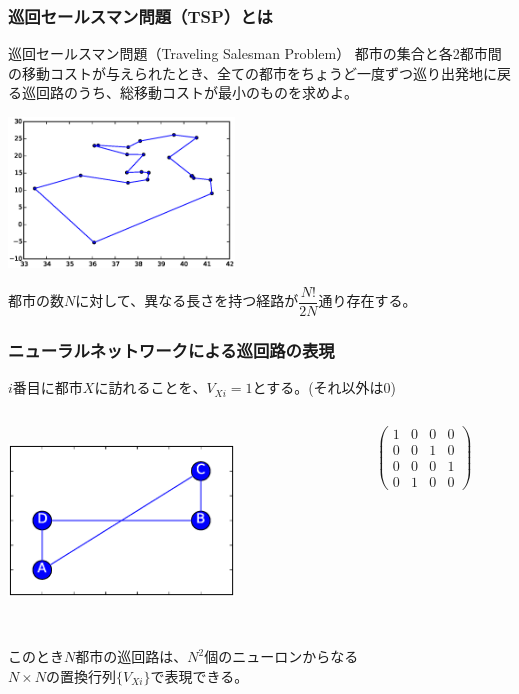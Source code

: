 \documentclass[dvipdfmx,11pt,notheorems]{beamer}
\theoremstyle{definition}
\begin{document}
\begin{frame}\frametitle{巡回セールスマン問題（TSP）とは}
\begin{block}{巡回セールスマン問題（Traveling Salesman Problem）}
都市の集合と各2都市間の移動コストが与えられたとき、全ての都市をちょうど一度ずつ巡り出発地に戻る巡回路のうち、総移動コストが最小のものを求めよ。
\end{block}
\begin{center}
\includegraphics[height=4cm, width=6cm]{opt_route.eps}
\end{center}
都市の数$N$に対して、異なる長さを持つ経路が$\dfrac{N!}{2N}$通り存在する。
\end{frame}

\begin{frame}\frametitle{ニューラルネットワークによる巡回路の表現}
$i$番目に都市$X$に訪れることを、$V_{Xi} = 1$とする。(それ以外は$0$)
\begin{columns}[T]
\begin{column}[T]{5cm}
\includegraphics[height=5cm, width=6cm]{route.eps}
\end{column}
\begin{column}[T]{5cm}
\vspace{1cm}
\large{
\[
  \left(
    \begin{array}{cccc}
      1 & 0 & 0 & 0  \\
      0 & 0 & 1 & 0 \\
      0 & 0 & 0 & 1 \\
      0 & 1 & 0 & 0
    \end{array}
  \right)
\]
}
\end{column}
\end{columns}
このとき$N$都市の巡回路は、$N^{2}$個のニューロンからなる \\
$N \times N$の置換行列$\{V_{Xi}\}$で表現できる。\\
\end{frame}
\end{document}
